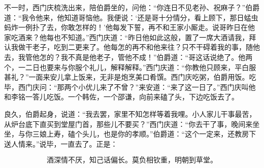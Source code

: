 不一时，西门庆梳洗出来，陪伯爵坐的，问他：“你连日不见老孙、祝麻子？”伯爵道：“我令他来，他知道哥恼他。我便说：‘还是哥十分情分，看上顾下，那日蜢虫蚂炸一例扑了去，你敢怎样的！’他每发下誓，再不和王家小厮走。说哥昨日在他家吃酒来？他每也不知道。”西门庆道：“昨日他如此这般，置了一席大酒请我，拜认我做干老子，吃到二更来了。他每怎的再不和他来往？只不干碍着我的事，随他去，我管他怎的？我不真是他老子，管他不成！”伯爵道：“哥这话说绝了。他两个，一二日也要来与你服个礼儿，解释解释。”西门庆道：“你教他只顾来，平白服甚礼？”一面来安儿拿上饭来，无非是炮烹美口肴馔。西门庆吃粥，伯爵用饭。吃毕，西门庆问：“那两个小优儿来了不曾？”来安道：“来了这一日了。”西门庆叫他和李铭一答儿吃饭。一个韩佐，一个邵谦，向前来磕了头，下边吃饭去了。

良久，伯爵起身，说道：“我去罢，家里不知怎样等着我哩。小人家儿干事最苦，从炉台底下直买到堂屋门首，那些儿不要买？”西门庆道：“你去干了事，晚间来坐坐，与你三娘上寿，磕个头儿，也是你的孝顺。”伯爵道：“这个一定来，还教房下送人情来。”说毕，一直去了。正是：

\[
酒深情不厌，知己话偏长。
莫负相钦重，明朝到草堂。
\]
